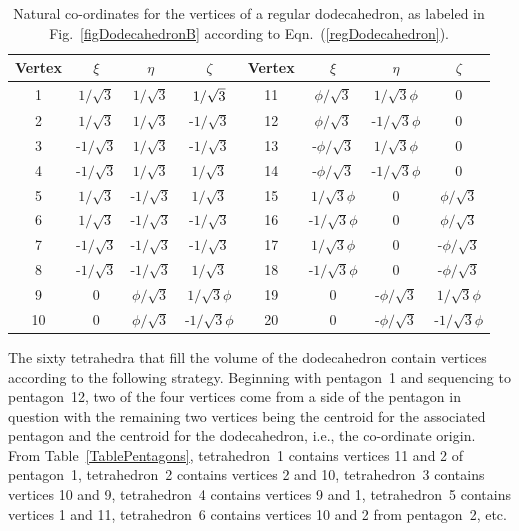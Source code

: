 \begin{table}
	\begin{center}
	\begin{tabular}{|c|ccc||c|ccc|}
		\hline 
		Vertex & $\xi$ & $\eta$ & $\zeta$ & Vertex & $\xi$ & $\eta$ & $\zeta$ \\ \hline
		1 & $1 / \sqrt{3}$ & $1 / \sqrt{3}$ & $1 / \sqrt{3}^{\vphantom{|}}$ & 
		   11 & $\phi / \sqrt{3}$ & $1 / \sqrt{3} \phi$ & 0 \\
		2 & $1 / \sqrt{3}$ & $1 / \sqrt{3}$ & -$1 / \sqrt{3}$ & 
		   12 & $\phi / \sqrt{3}$ & -$1 / \sqrt{3}\phi$ & 0 \\
		3 & -$1 / \sqrt{3}$ & $1 / \sqrt{3}$ & -$1 / \sqrt{3}$ & 
		   13 & -$\phi / \sqrt{3}$ & $1/ \sqrt{3}\phi$ & 0 \\
		4 & -$1 / \sqrt{3}$ & $1 / \sqrt{3}$ & $1 / \sqrt{3}$ & 
		   14 & -$\phi / \sqrt{3}$ & -$1 / \sqrt{3}\phi$ & 0 \\
		5 & $1 / \sqrt{3}$ & -$1 / \sqrt{3}$ & $1 / \sqrt{3}$ & 
		   15 & $1 / \sqrt{3} \phi$ & 0 & $\phi / \sqrt{3}$ \\
		6 & $1 / \sqrt{3}$ & -$1 / \sqrt{3}$ & -$1 / \sqrt{3}$ & 
		   16 & -$1 / \sqrt{3}\phi$ & 0 & $\phi / \sqrt{3}$ \\
		7 & -$1 / \sqrt{3}$ & -$1 / \sqrt{3}$ & -$1 / \sqrt{3}$ & 
		   17 & $1 / \sqrt{3}\phi$ & 0 & -$\phi / \sqrt{3}$ \\
		8 & -$1 / \sqrt{3}$ & -$1 / \sqrt{3}$ & $1 / \sqrt{3}$ & 
		   18 & -$1 / \sqrt{3}\phi$ & 0 & -$\phi / \sqrt{3}$ \\
		9 & 0 & $\phi / \sqrt{3}$ & $1 / \sqrt{3}\phi$ & 
		   19 & 0 & -$\phi / \sqrt{3}$ & $1 / \sqrt{3}\phi$ \\
		10 & 0 & $\phi / \sqrt{3}$ & -$1 / \sqrt{3}\phi$ & 
		   20 & 0 & -$\phi / \sqrt{3}$ & -$1 / \sqrt{3}\phi$ \\
		\hline
	\end{tabular}
	\end{center}
	\caption{Natural co-ordinates for the vertices of a regular dodecahedron, as labeled in Fig.~\ref{figDodecahedronB} according to Eqn.~(\ref{regDodecahedron}).}
	\label{TableDodecahedron}
\end{table}

The sixty tetrahedra that fill the volume of the dodecahedron contain vertices according to the following strategy.  Beginning with pentagon~1 and sequencing to pentagon~12, two of the four vertices come from a side of the pentagon in question with the remaining two vertices being the centroid for the associated pentagon and the centroid for the dodecahedron, i.e., the co-ordinate origin.  From Table~\ref{TablePentagons}, tetrahedron~1 contains vertices 11 and 2 of pentagon~1, tetrahedron~2 contains vertices 2 and 10, tetrahedron~3 contains vertices 10 and 9, tetrahedron~4 contains vertices 9 and 1, tetrahedron~5 contains vertices 1 and 11, tetrahedron~6 contains vertices 10 and 2 from pentagon~2, etc.


